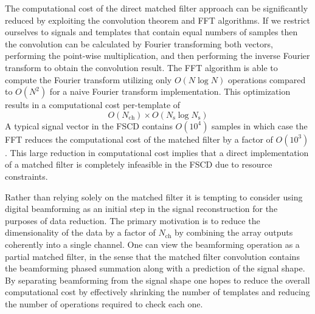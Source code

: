 The computational cost of the direct matched filter approach can be significantly reduced by exploiting the convolution theorem and FFT algorithms. If we restrict ourselves to signals and templates that contain equal numbers of samples then the convolution can be calculated by Fourier transforming both vectors, performing the point-wise multiplication, and then performing the inverse Fourier transform to obtain the convolution result. The FFT algorithm is able to compute the Fourier transform utilizing only $O(N\log{N})$ operations compared to $O(N^2)$ for a naive Fourier transform implementation. This optimization results in a computational cost per-template of
\begin{equation}
    O(N_\mathrm{ch})\times O(N_\mathrm{s}\log{N_\mathrm{s}})
\end{equation}
A typical signal vector in the FSCD contains $O(10^4)$ samples in which case the FFT reduces the computational cost of the matched filter by a factor of $O(10^3)$. This large reduction in computational cost implies that a direct implementation of a matched filter is completely infeasible in the FSCD due to resource constraints. 

Rather than relying solely on the matched filter it is tempting to consider using digital beamforming as an initial step in the signal reconstruction for the purposes of data reduction. The primary motivation is to reduce the dimensionality of the data by a factor of $N_\mathrm{ch}$ by combining the array outputs coherently into a single channel. One can view the beamforming operation as a partial matched filter, in the sense that the matched filter convolution contains the beamforming phased summation along with a prediction of the signal shape. By separating beamforming from the signal shape one hopes to reduce the overall computational cost by effectively shrinking the number of templates and reducing the number of operations required to check each one.

